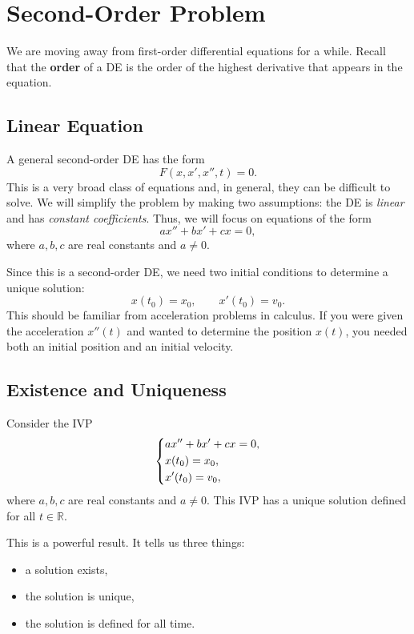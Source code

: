 \documentclass[10pt,letterpaper]{article}
\begin{document}
\section{Second-Order Problem}
We are moving away from first-order differential equations for a while. Recall that the \textbf{order} of a DE is the order of the highest derivative that appears in the equation.


\subsection{Linear Equation}
A general second-order DE has the form
\[
F(x,x',x'',t)=0.
\]
This is a very broad class of equations and, in general, they can be difficult to solve. We will simplify the problem by making two assumptions: the DE is \textit{linear} and has \textit{constant coefficients}. Thus, we will focus on equations of the form
\[
ax''+bx'+cx=0,
\]
where $a,b,c$ are real constants and $a\neq0$.

Since this is a second-order DE, we need two initial conditions to determine a unique solution:
\[
x(t_0)=x_0,
\qquad
x'(t_0)=v_0.
\]
This should be familiar from acceleration problems in calculus. If you were given the acceleration $x''(t)$ and wanted to determine the position $x(t)$, you needed both an initial position and an initial velocity.


\subsection{Existence and Uniqueness}

\begin{theorem}
Consider the IVP
\[
\begin{dcases}
ax''+bx'+cx=0,\\
x(t_0)=x_0,\\
x'(t_0)=v_0,
\end{dcases}
\]
where $a,b,c$ are real constants and $a\neq0$. This IVP has a unique solution defined for all $t\in \mathbb{R}$.

\end{theorem}

This is a powerful result. It tells us three things:
\begin{itemize}
    \item a solution exists,
    \item the solution is unique,
    \item the solution is defined for all time.
\end{itemize}
\end{document}
